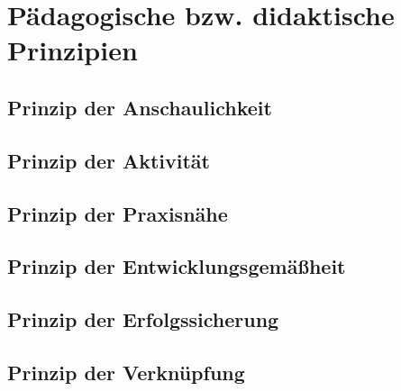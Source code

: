 \chapter{Pädagogische bzw. didaktische Prinzipien}

\section{Prinzip der Anschaulichkeit}



\section{Prinzip der Aktivität}


\section{Prinzip der Praxisnähe}


\section{Prinzip der Entwicklungsgemäßheit}


\section{Prinzip der Erfolgssicherung}


\section{Prinzip der Verknüpfung}



